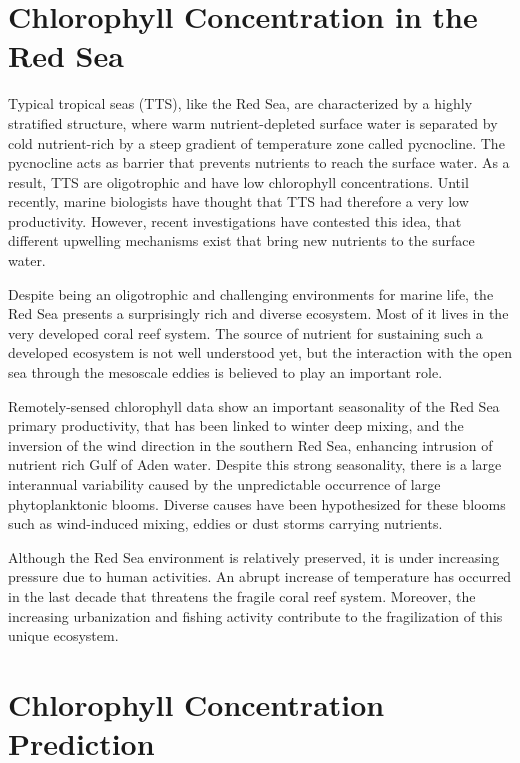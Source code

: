 \section{Chlorophyll Concentration in the Red Sea}

Typical tropical seas (TTS), like the Red Sea, are characterized by a highly stratified structure, where warm nutrient-depleted surface water is separated by cold nutrient-rich by a steep gradient of temperature zone called pycnocline. The pycnocline acts as barrier that prevents nutrients to reach the surface water. As a result, TTS are oligotrophic and have low chlorophyll concentrations. Until recently, marine biologists have thought that TTS had therefore a very low productivity. However, recent investigations have contested this idea, that different upwelling mechanisms exist that bring new nutrients to the surface water. 

Despite being an oligotrophic and challenging environments for marine life, the Red Sea presents a surprisingly rich and diverse ecosystem. Most of it lives in the very developed coral reef system. The source of nutrient for sustaining such a developed ecosystem is not well understood yet, but the interaction with the open sea through the mesoscale eddies is believed to play an important role. 

Remotely-sensed chlorophyll data show an important seasonality of the Red Sea primary productivity, that has been linked to winter deep mixing, and the inversion of the wind direction in the southern Red Sea, enhancing intrusion of nutrient rich Gulf of Aden water. Despite this strong seasonality, there is a large interannual variability caused by the unpredictable occurrence of large phytoplanktonic blooms. Diverse causes have been hypothesized for these blooms such as wind-induced mixing, eddies or dust storms carrying nutrients. 

Although the Red Sea environment is relatively preserved, it is under increasing pressure due to human activities. An abrupt increase of temperature has occurred in the last decade that threatens the fragile coral reef system. Moreover, the increasing urbanization and fishing activity contribute to the fragilization of this unique ecosystem.

\section{Chlorophyll Concentration Prediction}

